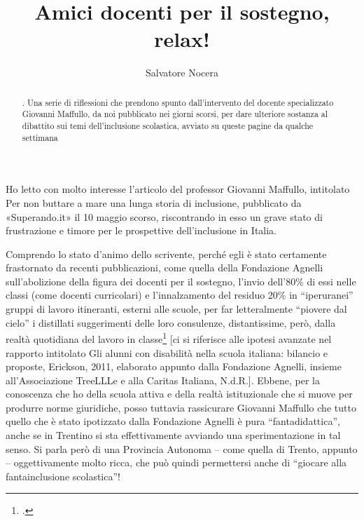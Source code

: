 \author{Salvatore Nocera}
\title{Amici docenti per il sostegno, relax! }
\label{cha:nocera130513}
\begin{abstract}
. Una serie di riflessioni che prendono spunto dall'intervento del docente specializzato Giovanni Maffullo, da noi pubblicato nei giorni scorsi, per dare ulteriore sostanza al dibattito sui temi dell'inclusione scolastica, avviato su queste pagine da qualche settimana
\end{abstract}
\maketitle
{}
Ho letto con molto interesse l'articolo del professor Giovanni Maffullo\pageref{cha:maffullo100513}, intitolato Per non buttare a mare una lunga storia di inclusione, pubblicato da «Superando.it» il 10 maggio scorso, riscontrando in esso un grave stato di frustrazione e timore per le prospettive dell'inclusione in Italia.

Comprendo lo stato d'animo dello scrivente, perché egli è stato certamente frastornato da recenti pubblicazioni, come quella della Fondazione Agnelli sull'abolizione della figura dei docenti per il sostegno, l'invio dell'80\% di essi nelle classi (come docenti curricolari) e l'innalzamento del residuo 20\% in “iperuranei” gruppi di lavoro itineranti, esterni alle scuole, per far letteralmente “piovere dal cielo” i distillati suggerimenti delle loro consulenze, distantissime, però, dalla realtà quotidiana del lavoro in classe\footcite{treellle2011alunni} [ci si riferisce alle ipotesi avanzate nel rapporto intitolato Gli alunni con disabilità nella scuola italiana: bilancio e proposte, Erickson, 2011, elaborato appunto dalla Fondazione Agnelli, insieme all'Associazione TreeLLLe e alla Caritas Italiana, N.d.R.].
Ebbene, per la conoscenza che ho della scuola attiva e della realtà  istituzionale che si muove per produrre norme giuridiche, posso tuttavia rassicurare Giovanni Maffullo che tutto quello che è stato ipotizzato dalla Fondazione Agnelli è pura “fantadidattica”, anche se in Trentino si sta effettivamente avviando una sperimentazione in tal senso. Si parla però di una Provincia Autonoma – come quella di Trento, appunto – oggettivamente molto ricca, che può quindi permettersi anche di “giocare alla fantainclusione scolastica”!

